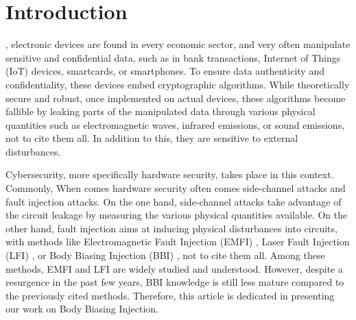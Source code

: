 
\section{Introduction}

	, electronic devices are found in every economic sector, and very often manipulate sensitive and confidential data, such as in bank transactions, Internet of Things (IoT) devices, smartcards, or smartphones.
	To ensure data authenticity and confidentiality, these devices embed cryptographic algorithms.
	While theoretically secure and robust, once implemented on actual devices, these algorithms become fallible by leaking parts of the manipulated data through various physical quantities such as electromagnetic waves, infrared emissions, or sound emissions, not to cite them all.
	In addition to this, they are sensitive to external disturbances.

	Cybersecurity, more specifically hardware security, takes place in this context.
	Commonly, When comes hardware security often comes side-channel attacks and fault injection attacks.
	On the one hand, side-channel attacks take advantage of the circuit leakage by measuring the various physical quantities available.
	On the other hand, fault injection aims at inducing physical disturbances into circuits, with methods like Electromagnetic Fault Injection (EMFI) \cite{mathieuEMFIFirst, mathieuEMFI}, Laser Fault Injection (LFI) \cite{lfiFaultModel}, or Body Biasing Injection (BBI) \cite{bbiOrigin}, not to cite them all.
	Among these methods, EMFI and LFI are widely studied and understood.
	However, despite a resurgence in the past few years, BBI knowledge is still less mature compared to the previously cited methods.
	Therefore, this article is dedicated in presenting our work on Body Biasing Injection.

